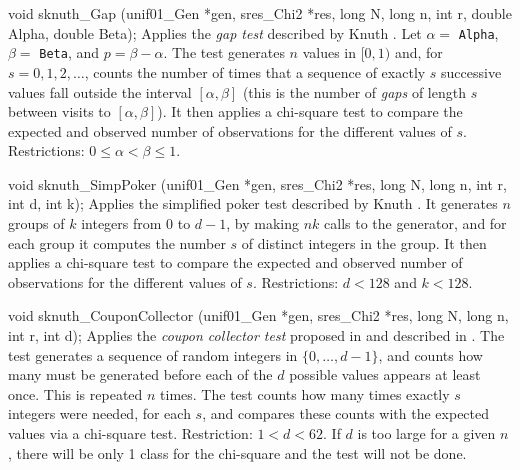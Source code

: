 void sknuth_Gap (unif01_Gen *gen, sres_Chi2 *res,
                 long N, long n, int r, double Alpha, double Beta);
\endcode
 \tab  Applies
   the {\em gap test\/} described by Knuth \cite{rKEN38a,rKEN39a,rKNU98a}.
   Let $\alpha=$ {\tt Alpha}, $\beta=$ {\tt Beta}, and $p=\beta-\alpha$.
   The test generates  $n$ values in $[0,1)$ and, for $s=0,1,2,\dots$, 
   counts the number of times that a sequence of exactly $s$ successive
   values fall outside the interval $[\alpha,\beta]$
   (this is the number of {\em gaps\/} of length $s$ between visits to
   $[\alpha,\beta]$).   It then applies a chi-square test 
   to compare the expected and observed number of observations for the
   different values of $s$.
   Restrictions:  $0\le\alpha < \beta\le 1$.
 \endtab
\code


void sknuth_SimpPoker (unif01_Gen *gen, sres_Chi2 *res,
                       long N, long n, int r, int d, int k);
\endcode
  \tab  Applies
   the simplified {\rm poker test\/} described by
   Knuth \cite{rKEN38a,rKEN39a,rKNU98a}.
   It generates $n$ groups of $k$ integers from 0 to $d-1$,
   by making $nk$ calls to the generator, and for each group it computes
   the number $s$ of distinct integers in the group.
   It then applies a chi-square test 
   to compare the expected and observed number of observations for the
   different values of $s$.
   Restrictions: $d < 128$ and $k < 128$.
  \endtab
\code


void sknuth_CouponCollector (unif01_Gen *gen, sres_Chi2 *res,
                             long N, long n, int r, int d);
\endcode
  \tab   Applies the {\em coupon collector test\/} proposed in \cite{rGRE55a}
    and described in \cite{rKNU98a}. 
   The test generates a sequence of random integers in $\{0,\dots,d-1\}$,
   and counts how many must be generated before each of the
   $d$ possible values appears at least once. 
   This is repeated $n$ times.  The test counts how many times exactly
   $s$ integers were needed, for each $s$, and compares these counts
   with the expected values via a chi-square test.
   Restriction: $1<d < 62$. If $d$ is too large for a given $n$, there
   will be only 1 class for the chi-square and the test will not be done.
 \endtab
\code


